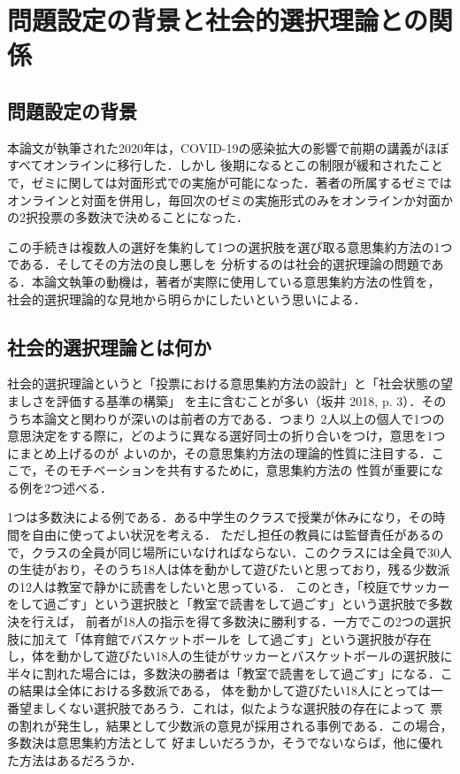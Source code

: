 \documentclass[dvipdfmx]{jsarticle}
\begin{document}
\newpage
\tableofcontents
\clearpage

\section{問題設定の背景と社会的選択理論との関係}\label{sec:問題設定の背景と社会的選択理論との関係}
\subsection{問題設定の背景}
本論文が執筆された2020年は，COVID-19の感染拡大の影響で前期の講義がほぼすべてオンラインに移行した．しかし
後期になるとこの制限が緩和されたことで，ゼミに関しては対面形式での実施が可能になった．著者の所属するゼミでは
オンラインと対面を併用し，毎回次のゼミの実施形式のみをオンラインか対面かの2択投票の多数決で決めることになった．

この手続きは複数人の選好を集約して1つの選択肢を選び取る意思集約方法の1つである．そしてその方法の良し悪しを
分析するのは社会的選択理論の問題である．本論文執筆の動機は，著者が実際に使用している意思集約方法の性質を，
社会的選択理論的な見地から明らかにしたいという思いによる．

\subsection{社会的選択理論とは何か}\label{社会的選択とは何か}
社会的選択理論というと「投票における意思集約方法の設計」と「社会状態の望ましさを評価する基準の構築」
を主に含むことが多い（坂井 2018, p. 3）．そのうち本論文と関わりが深いのは前者の方である．つまり
2人以上の個人で1つの意思決定をする際に，どのように異なる選好同士の折り合いをつけ，意思を1つにまとめ上げるのが
よいのか，その意思集約方法の理論的性質に注目する．ここで，そのモチベーションを共有するために，意思集約方法の
性質が重要になる例を2つ述べる．

1つは多数決による例である．ある中学生のクラスで授業が休みになり，その時間を自由に使ってよい状況を考える．
ただし担任の教員には監督責任があるので，クラスの全員が同じ場所にいなければならない．このクラスには全員で30人
の生徒がおり，そのうち18人は体を動かして遊びたいと思っており，残る少数派の12人は教室で静かに読書をしたいと思っている．
このとき，「校庭でサッカーをして過ごす」という選択肢と「教室で読書をして過ごす」という選択肢で多数決を行えば，
前者が18人の指示を得て多数決に勝利する．一方でこの2つの選択肢に加えて「体育館でバスケットボールを
して過ごす」という選択肢が存在し，体を動かして遊びたい18人の生徒がサッカーとバスケットボールの選択肢に
半々に割れた場合には，多数決の勝者は「教室で読書をして過ごす」になる．この結果は全体における多数派である，
体を動かして遊びたい18人にとっては一番望ましくない選択肢であろう．これは，似たような選択肢の存在によって
票の割れが発生し，結果として少数派の意見が採用される事例である．この場合，多数決は意思集約方法として
好ましいだろうか，そうでないならば，他に優れた方法はあるだろうか．
\end{document}
